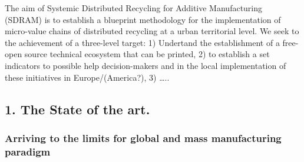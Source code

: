 \documentclass[
  11pt,
  a4paperpaper,
  onecolumn]{article}
\begin{document}
\begin{tcolorbox}[enhanced jigsaw, title=\textcolor{quarto-callout-note-color}{\faInfo}\hspace{0.5em}{DRAM in a nutshell}, colframe=quarto-callout-note-color-frame, colback=white, arc=.35mm, coltitle=black, toprule=.15mm, toptitle=1mm, opacityback=0, colbacktitle=quarto-callout-note-color!10!white, rightrule=.15mm, left=2mm, bottomrule=.15mm, bottomtitle=1mm, breakable, titlerule=0mm, leftrule=.75mm, opacitybacktitle=0.6]
The aim of Systemic Distributed Recycling for Additive Manufacturing
(SDRAM) is to establish a blueprint methodology for the implementation
of micro-value chains of distributed recycling at a urban territorial
level. We seek to the achievement of a three-level target: 1) Undertand
the establishment of a free-open source technical ecosystem that can be
printed, 2) to establish a set indicators to possible help
decision-makers and in the local implementation of these initiatives in
Europe/(America?), 3) \ldots..
\end{tcolorbox}

\hypertarget{the-state-of-the-art.}{%
\subsection{1. The State of the art.}\label{the-state-of-the-art.}}

\linenumbers

\hypertarget{arriving-to-the-limits-for-global-and-mass-manufacturing-paradigm}{%
\subsubsection{Arriving to the limits for global and mass manufacturing
paradigm}\label{arriving-to-the-limits-for-global-and-mass-manufacturing-paradigm}}
\end{document}
